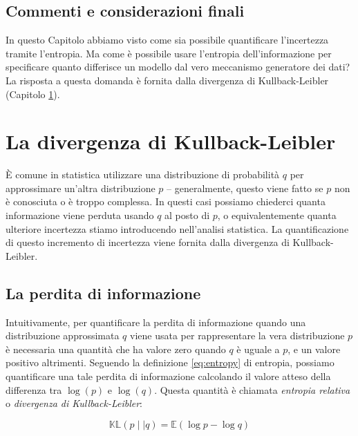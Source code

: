 \documentclass[
  11pt,
]{krantz}
\newcommand{\E}{\mathbb{E}} %
\theoremstyle{definition}
\theoremstyle{definition}
\theoremstyle{definition}
\theoremstyle{definition}
\theoremstyle{remark}
\begin{document}
\hypertarget{commenti-e-considerazioni-finali}{%
\section*{Commenti e considerazioni finali}\label{commenti-e-considerazioni-finali}}


In questo Capitolo abbiamo visto come sia possibile quantificare l'incertezza tramite l'entropia. Ma come è possibile usare l'entropia dell'informazione per specificare quanto differisce un modello dal vero meccanismo generatore dei dati? La risposta a questa domanda è fornita dalla divergenza di Kullback-Leibler (Capitolo \ref{ch:kl-div}).

\hypertarget{ch:kl-div}{%
\chapter{La divergenza di Kullback-Leibler}\label{ch:kl-div}}

È comune in statistica utilizzare una distribuzione di probabilità \(q\) per approssimare un'altra distribuzione \(p\) -- generalmente, questo viene fatto se \(p\) non è conosciuta o è troppo complessa. In questi casi possiamo chiederci quanta informazione viene perduta usando \(q\) al posto di \(p\), o equivalentemente quanta ulteriore incertezza stiamo introducendo nell'analisi statistica. La quantificazione di questo incremento di incertezza viene fornita dalla divergenza di Kullback-Leibler.

\hypertarget{la-perdita-di-informazione}{%
\section{La perdita di informazione}\label{la-perdita-di-informazione}}

Intuitivamente, per quantificare la perdita di informazione quando una distribuzione approssimata \(q\) viene usata per rappresentare la vera distribuzione \(p\) è necessaria una quantità che ha valore zero quando \(q\) è uguale a \(p\), e un valore positivo altrimenti. Seguendo la definizione \eqref{eq:entropy} di entropia, possiamo quantificare una tale perdita di informazione calcolando il valore atteso della differenza tra \(\log(p)\) e \(\log(q)\). Questa quantità è chiamata \emph{entropia relativa} o \emph{divergenza di Kullback-Leibler}:

\begin{equation}
\mathbb{KL} (p \mid\mid q) = \E (\log p - \log q)
\label{eq:kldivergence}
\end{equation}
\end{document}
